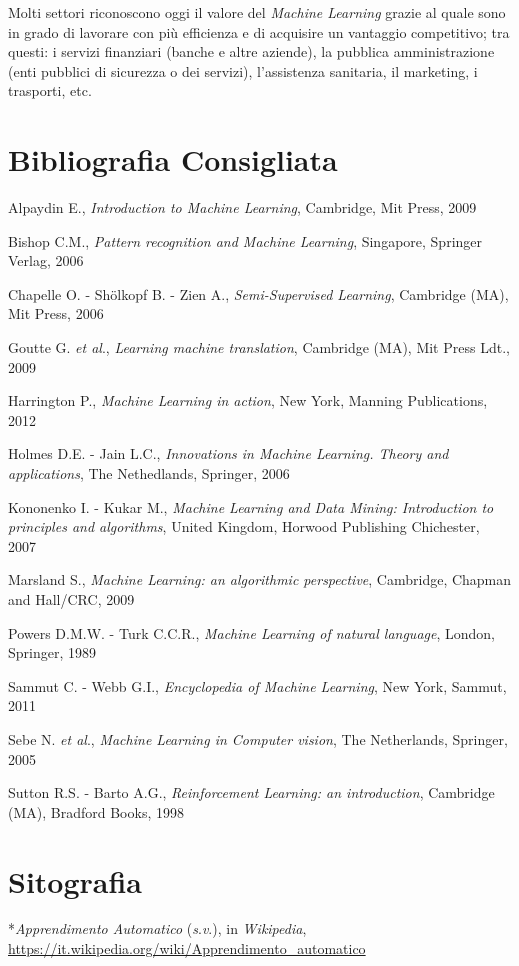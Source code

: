 {Molti settori riconoscono oggi il valore del \emph{Machine Learning}
grazie al quale sono in grado di lavorare con più efficienza e di
acquisire un vantaggio competitivo; tra questi: i servizi finanziari
(banche e altre aziende), la pubblica amministrazione (enti pubblici di
sicurezza o dei servizi), l'assistenza sanitaria, il marketing, i
trasporti, etc.

\section*{Bibliografia Consigliata}
{\parindent0pt 
Alpaydin E., \emph{Introduction to Machine Learning}, Cambridge, Mit
Press, 2009

Bishop C.M., \emph{Pattern recognition and Machine Learning}, Singapore,
Springer Verlag, 2006

Chapelle O. - Shölkopf B. - Zien A., \emph{Semi-Supervised Learning},
Cambridge (MA), Mit Press, 2006

Goutte G. \emph{et al}., \emph{Learning machine translation}, Cambridge
(MA), Mit Press Ldt., 2009

Harrington P., \emph{Machine Learning in action}, New York, Manning
Publications, 2012

Holmes D.E. - Jain L.C., \emph{Innovations in Machine Learning. Theory
and applications}, The Nethedlands, Springer, 2006

Kononenko I. - Kukar M., \emph{Machine Learning and Data Mining:
Introduction to principles and algorithms}, United Kingdom, Horwood
Publishing Chichester, 2007

Marsland S., \emph{Machine Learning: an algorithmic perspective},
Cambridge, Chapman and Hall/CRC, 2009

Powers D.M.W. - Turk C.C.R., \emph{Machine Learning of natural
language}, London, Springer, 1989

Sammut C. - Webb G.I., \emph{Encyclopedia of Machine Learning}, New
York, Sammut, 2011

Sebe N. \emph{et al}., \emph{Machine Learning in Computer vision}, The
Netherlands, Springer, 2005

Sutton R.S. - Barto A.G., \emph{Reinforcement Learning: an
introduction}, Cambridge (MA), Bradford Books, 1998
}

\section*{Sitografia}
{\parindent0pt 
*\emph{Apprendimento Automatico} (\emph{s}.\emph{v}.), in
\emph{Wikipedia},
\url{https://it.wikipedia.org/wiki/Apprendimento_automatico}

}}
